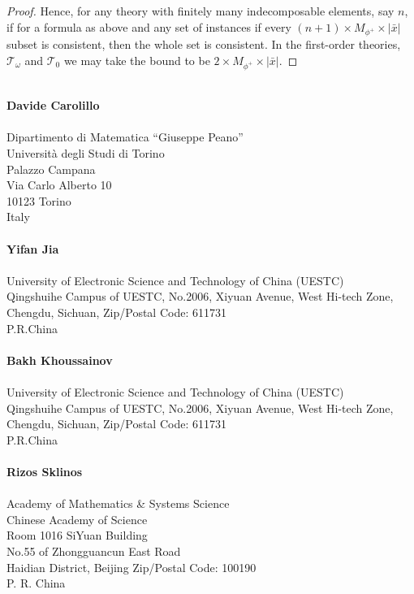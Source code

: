 \documentclass[a4paper,11pt]{article}
\begin{document}
\begin{proof}
Hence, for any theory with finitely many indecomposable elements, say $n$, if for a formula as above and any set of instances if every $(n+1)\times M_{\phi^+}\times |\bar x|$ subset is consistent, then the whole set is consistent. In the first-order theories, $\mathcal{T}_\omega$ and $\mathcal{T}_0$ we may take the bound to be  $2\times M_{\phi^+}\times |\bar x|$.  
\end{proof}







\newpage 
\ \\
{\bf Davide Carolillo}\\ \\
Dipartimento di Matematica ``Giuseppe Peano''\\
Universit\`a degli Studi di Torino\\
Palazzo Campana\\
Via Carlo Alberto 10\\
10123 Torino\\
Italy
\ \\ \\
{\bf Yifan Jia}\\ \\
University of Electronic Science and Technology of China (UESTC) \\
Qingshuihe Campus of UESTC, No.2006, Xiyuan Avenue, West Hi-tech Zone,\\
Chengdu, Sichuan, Zip/Postal Code: 611731 \\ 
P.R.China
\ \\ \\
{\bf Bakh Khoussainov}\\ \\
University of Electronic Science and Technology of China (UESTC) \\
Qingshuihe Campus of UESTC, No.2006, Xiyuan Avenue, West Hi-tech Zone,\\
Chengdu, Sichuan, Zip/Postal Code: 611731 \\ 
P.R.China
\ \\ \\
{\bf Rizos Sklinos}\\ \\
Academy of Mathematics \& Systems Science\\
Chinese Academy of Science\\
Room 1016 SiYuan Building\\
No.55 of Zhongguancun East Road\\
Haidian District, Beijing Zip/Postal Code: 100190\\
P. R. China
\end{document}
